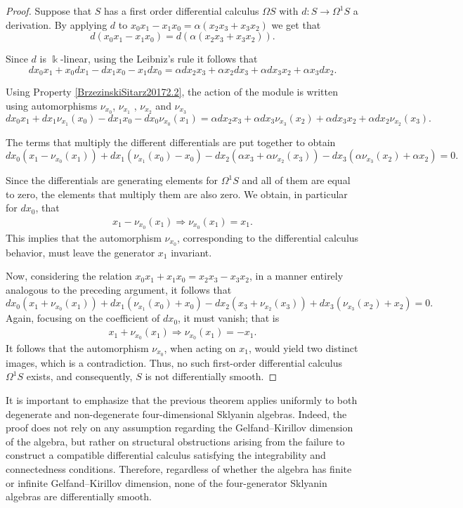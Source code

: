 \documentclass{amsart}
\theoremstyle{definition}
\theoremstyle{remark}
\numberwithin{equation}{section}
\begin{document}
\begin{proof}
Suppose that $S$ has a first order differential calculus $\Omega S$ with $d: S \rightarrow \Omega^1S$ a derivation. By applying $d$ to $x_0 x_1  - x_1 x_0 =   \alpha(x_2x_3 + x_3x_2)$ we get that 
\[
d(x_0 x_1  - x_1 x_0) =  d(\alpha(x_2x_3 + x_3x_2)).
\]

Since $d$ is $\Bbbk$-linear, using the Leibniz's rule it follows that
\[
dx_0 x_1+x_0dx_1  - dx_1 x_0-x_1dx_0 =  \alpha dx_2x_3 +\alpha x_2dx_3 + \alpha dx_3x_2 + \alpha x_3dx_2.
\]

Using Property \ref{BrzezinskiSitarz20172.2}, the action of the module is written using automorphisms $\nu_{x_0}$, $\nu_{x_1}$ , $\nu_{x_2}$ and $\nu_{x_3}$
{\small{\[
dx_0 x_1+dx_1\nu_{x_1}(x_0)  - dx_1 x_0-dx_0\nu_{x_0}(x_1) =  \alpha dx_2x_3 +\alpha dx_3\nu_{x_3}(x_2) + \alpha dx_3x_2 + \alpha dx_2\nu_{x_2}(x_3).
\]}}

The terms that multiply the different differentials are put together to obtain
\[
dx_0(x_1-\nu_{x_0}(x_1))+dx_1(\nu_{x_1}(x_0) - x_0) -dx_2(\alpha x_3+\alpha\nu_{x_2}(x_3))-dx_3(\alpha\nu_{x_3}(x_2)+\alpha x_2) = 0.
\]
 
Since the differentials are generating elements for $\Omega^1S$ and all of them are equal to zero, the elements that multiply them are also zero. We obtain, in particular for $dx_0$, that 
\begin{align*}
    x_1-\nu_{x_0}(x_1) \Rightarrow \nu_{x_0}(x_1)=x_1.
\end{align*}
This implies that the automorphism $\nu_{x_0}$, corresponding to the differential calculus behavior, must leave the generator $x_1$ invariant.

Now, considering the relation $x_0x_1 + x_1x_0 = x_2x_3 - x_3x_2$, in a manner entirely analogous to the preceding argument, it follows that
\[
dx_0(x_1+\nu_{x_0}(x_1))+dx_1(\nu_{x_1}(x_0) + x_0) -dx_2( x_3+\nu_{x_2}(x_3))+dx_3(\nu_{x_3}(x_2)+ x_2) = 0.
\]
Again, focusing on the coefficient of $dx_0$, it must vanish; that is
\begin{align*}
    x_1+\nu_{x_0}(x_1) \Rightarrow \nu_{x_0}(x_1)=-x_1.
\end{align*}
It follows that the automorphism $\nu_{x_0}$, when acting on $x_1$, would yield two distinct images, which is a contradiction. Thus, no such first-order differential calculus $\Omega^1 S$ exists, and consequently, $S$ is not differentially smooth.
\end{proof}

It is important to emphasize that the previous theorem applies uniformly to both degenerate and non-degenerate four-dimensional Sklyanin algebras. Indeed, the proof does not rely on any assumption regarding the Gelfand–Kirillov dimension of the algebra, but rather on structural obstructions arising from the failure to construct a compatible differential calculus satisfying the integrability and connectedness conditions. Therefore, regardless of whether the algebra has finite or infinite Gelfand–Kirillov dimension, none of the four-generator Sklyanin algebras are differentially smooth.
\end{document}
